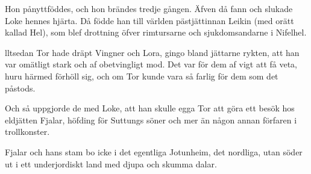 Hon pånyttföddes, och hon brändes tredje gången. Äfven då fann och
slukade Loke hennes hjärta. Då födde han till världen pästjättinnan
Leikin (med orätt kallad Hel), som blef drottning öfver rimtursarne och
sjukdomsandarne i Nifelhel.

\endSecII


\dropcapA lltsedan Tor hade dräpt Vingner och Lora, gingo bland jättarne rykten,
att han var omätligt stark och af obetvingligt mod. Det var för dem af
vigt att få veta, huru härmed förhöll sig, och om Tor kunde vara så
farlig för dem som det påstods.

Och så uppgjorde de med Loke, att han skulle egga Tor att göra ett besök
hos eldjätten Fjalar, höfding för Suttungs söner och mer än någon annan
förfaren i trollkonster.

Fjalar och hans stam bo icke i det egentliga Jotunheim, det nordliga,
utan söder ut i ett underjordiskt land med djupa och skumma dalar.


